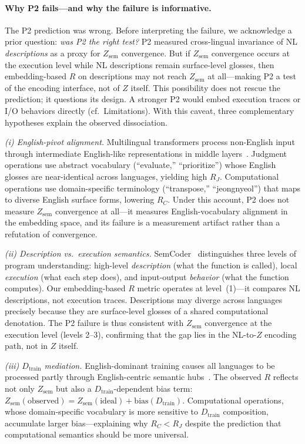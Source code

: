 \documentclass[11pt]{article}
\theoremstyle{definition}
\newcommand{\Zsem}{Z_{\text{sem}}}
\newcommand{\Dtrain}{D_{\text{train}}}
\begin{document}
\paragraph{Why P2 fails---and why the failure is informative.}
The P2 prediction was wrong. Before interpreting the failure, we acknowledge a prior question: \emph{was P2 the right test?} P2 measured cross-lingual invariance of NL \emph{descriptions} as a proxy for $\Zsem$ convergence. But if $\Zsem$ convergence occurs at the execution level while NL descriptions remain surface-level glosses, then embedding-based $R$ on descriptions may not reach $\Zsem$ at all---making P2 a test of the encoding interface, not of $Z$ itself. This possibility does not rescue the prediction; it questions its design. A stronger P2 would embed execution traces or I/O behaviors directly (cf.\ Limitations). With this caveat, three complementary hypotheses explain the observed dissociation.

\emph{(i) English-pivot alignment.}
Multilingual transformers process non-English input through intermediate English-like representations in middle layers~\cite{wendler2024llamas}. Judgment operations use abstract vocabulary (``evaluate,'' ``prioritize'') whose English glosses are near-identical across languages, yielding high $R_J$. Computational operations use domain-specific terminology (``transpose,'' ``jeongnyeol'') that maps to diverse English surface forms, lowering $R_C$. Under this account, P2 does not measure $\Zsem$ convergence at all---it measures English-vocabulary alignment in the embedding space, and its failure is a measurement artifact rather than a refutation of convergence.

\emph{(ii) Description vs.\ execution semantics.}
SemCoder~\cite{wan2024semcoder} distinguishes three levels of program understanding: high-level \emph{description} (what the function is called), local \emph{execution} (what each step does), and input-output \emph{behavior} (what the function computes). Our embedding-based $R$ metric operates at level~(1)---it compares NL descriptions, not execution traces. Descriptions may diverge across languages precisely because they are surface-level glosses of a shared computational denotation. The P2 failure is thus consistent with $\Zsem$ convergence at the execution level (levels 2--3), confirming that the gap lies in the NL-to-$Z$ encoding path, not in $Z$ itself.

\emph{(iii) $\Dtrain$ mediation.}
English-dominant training causes all languages to be processed partly through English-centric semantic hubs~\cite{wu2025semantichub}. The observed $R$ reflects not only $\Zsem$ but also a $\Dtrain$-dependent bias term: $\Zsem(\text{observed}) = \Zsem(\text{ideal}) + \mathrm{bias}(\Dtrain)$. Computational operations, whose domain-specific vocabulary is more sensitive to $\Dtrain$ composition, accumulate larger bias---explaining why $R_C < R_J$ despite the prediction that computational semantics should be more universal.
\end{document}
